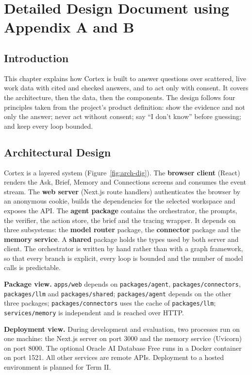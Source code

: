 \documentclass[oneside,a4paper,12pt]{report}
\begin{document}
\chapter{Detailed Design Document using Appendix A and B}
\label{ch:design}
 \section{Introduction}
This chapter explains how Cortex is built to answer questions over scattered, live work data with cited and checked answers, and to act only with consent. It covers the architecture, then the data, then the components. The design follows four principles taken from the project's product definition: show the evidence and not only the answer; never act without consent; say ``I don't know'' before guessing; and keep every loop bounded.
\section{Architectural Design}
	Cortex is a layered system (Figure~\ref{fig:arch-dig}). The \textbf{browser client} (React) renders the Ask, Brief, Memory and Connections screens and consumes the event stream. The \textbf{web server} (Next.js route handlers) authenticates the browser by an anonymous cookie, builds the dependencies for the selected workspace and exposes the API. The \textbf{agent package} contains the orchestrator, the prompts, the verifier, the action store, the brief and the tracing wrapper. It depends on three subsystems: the \textbf{model router} package, the \textbf{connector} package and the \textbf{memory service}. A \textbf{shared} package holds the types used by both server and client. The orchestrator is written by hand rather than with a graph framework, so that every branch is explicit, every loop is bounded and the number of model calls is predictable.

\textbf{Package view.} \texttt{apps/web} depends on \texttt{packages/agent}, \texttt{packages/connectors}, \texttt{packages/llm} and \texttt{packages/shared}; \texttt{packages/agent} depends on the other three packages; \texttt{packages/connectors} uses the cache of \texttt{packages/llm}; \texttt{services/memory} is independent and is reached over HTTP.

\textbf{Deployment view.} During development and evaluation, two processes run on one machine: the Next.js server on port 3000 and the memory service (Uvicorn) on port 8000. The optional Oracle AI Database Free runs in a Docker container on port 1521. All other services are remote APIs. Deployment to a hosted environment is planned for Term II.
\end{document}
